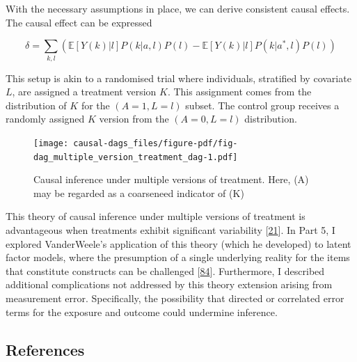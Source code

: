 \documentclass[
  singlecolumn]{article}
\begin{document}
With the necessary assumptions in place, we can derive consistent causal
effects. The causal effect can be expressed

\[\delta = \sum_{k,l} \left( \mathbb{E}[Y(k)|l] P(k|a,l) P(l) - \mathbb{E}[Y(k)|l] P(k|a^*,l) P(l) \right) \]

This setup is akin to a randomised trial where individuals, stratified
by covariate \(L\), are assigned a treatment version \(K\). This
assignment comes from the distribution of \(K\) for the
\((A = 1, L = l)\) subset. The control group receives a randomly
assigned \(K\) version from the \((A = 0, L = l)\) distribution.

\begin{figure}

{\centering \texttt{[image: causal-dags\_files/figure-pdf/fig-dag\_multiple\_version\_treatment\_dag-1.pdf]}

}

\caption{\label{fig-dag_multiple_version_treatment_dag}Causal inference
under multiple versions of treatment. Here, (A) may be regarded as a
coarseneed indicator of (K)}

\end{figure}

This theory of causal inference under multiple versions of treatment is
advantageous when treatments exhibit significant variability
{[}\protect\hyperlink{ref-vanderweele2013}{21}{]}. In Part 5, I explored
VanderWeele's application of this theory (which he developed) to latent
factor models, where the presumption of a single underlying reality for
the items that constitute constructs can be challenged
{[}\protect\hyperlink{ref-vanderweele2022}{84}{]}. Furthermore, I
described additional complications not addressed by this theory
extension arising from measurement error. Specifically, the possibility
that directed or correlated error terms for the exposure and outcome
could undermine inference.

\newpage{}

\hypertarget{references}{%
\subsection{References}\label{references}}
\end{document}
